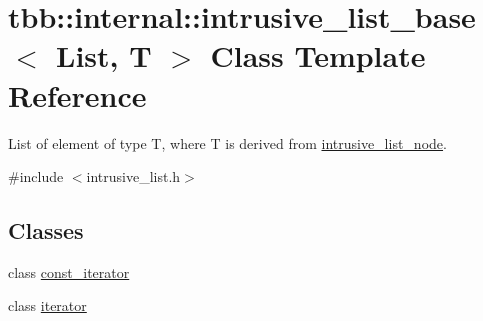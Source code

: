 \hypertarget{classtbb_1_1internal_1_1intrusive__list__base}{}\section{tbb\+:\+:internal\+:\+:intrusive\+\_\+list\+\_\+base$<$ List, T $>$ Class Template Reference}
\label{classtbb_1_1internal_1_1intrusive__list__base}


List of element of type T, where T is derived from \hyperlink{structtbb_1_1internal_1_1intrusive__list__node}{intrusive\+\_\+list\+\_\+node}.  




{\ttfamily \#include $<$intrusive\+\_\+list.\+h$>$}

\subsection*{Classes}
\begin{DoxyCompactItemize}
\item 
class \hyperlink{classtbb_1_1internal_1_1intrusive__list__base_1_1const__iterator}{const\+\_\+iterator}
\item 
class \hyperlink{classtbb_1_1internal_1_1intrusive__list__base_1_1iterator}{iterator}
\end{DoxyCompactItemize}
